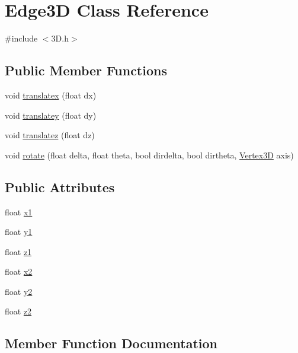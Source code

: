 \hypertarget{class_edge3_d}{}\section{Edge3D Class Reference}
\label{class_edge3_d}


{\ttfamily \#include $<$3\+D.\+h$>$}

\subsection*{Public Member Functions}
\begin{DoxyCompactItemize}
\item 
void \hyperlink{class_edge3_d_a0486103072407b6b2f28758c3294d5ff}{translatex} (float dx)
\item 
void \hyperlink{class_edge3_d_a0819dff9f29cdbe70dcf942ddd4066b8}{translatey} (float dy)
\item 
void \hyperlink{class_edge3_d_ad97daed3b61961f51eb0f051b4f546d8}{translatez} (float dz)
\item 
void \hyperlink{class_edge3_d_abc9bc6d0600d2b25b71c9979f6ff6b68}{rotate} (float delta, float theta, bool dirdelta, bool dirtheta, \hyperlink{class_vertex3_d}{Vertex3D} axis)
\end{DoxyCompactItemize}
\subsection*{Public Attributes}
\begin{DoxyCompactItemize}
\item 
float \hyperlink{class_edge3_d_a2a86071fbb2a8fe7e669ee60affc5990}{x1}
\item 
float \hyperlink{class_edge3_d_a7b49a8c2bb7702e7e128d2dbc5f3fbc2}{y1}
\item 
float \hyperlink{class_edge3_d_a436d6f44e6fafe5a9e6dd571b91b89a3}{z1}
\item 
float \hyperlink{class_edge3_d_a080aa60f80bd0fa0f092a60195d42165}{x2}
\item 
float \hyperlink{class_edge3_d_a9ea49e46204525af7f7608b8ac9f5f9b}{y2}
\item 
float \hyperlink{class_edge3_d_a1e311241800a66f37b5e5a501da05e15}{z2}
\end{DoxyCompactItemize}


\subsection{Member Function Documentation}
